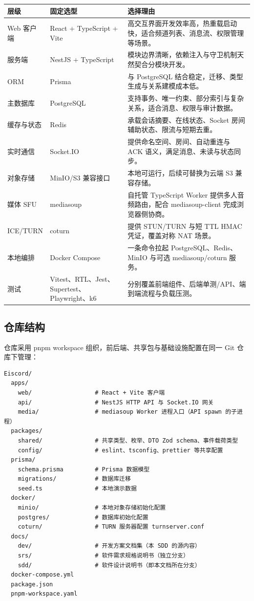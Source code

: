 \noindent\begin{tabularx}{\textwidth}{L{3.6cm}L{3.4cm}Y}
  \toprule
  层级 & 固定选型 & 选择理由 \\
  \midrule
  Web 客户端 & React + TypeScript + Vite & 高交互界面开发效率高，热重载启动快，适合频道列表、消息流、权限管理等场景。 \\
  服务端 & NestJS + TypeScript & 模块边界清晰，依赖注入与守卫机制天然契合分模块开发。 \\
  ORM & Prisma & 与 PostgreSQL 结合稳定，迁移、类型生成与关系建模成本低。 \\
  主数据库 & PostgreSQL & 支持事务、唯一约束、部分索引与复杂关系，适合消息、权限与审计数据。 \\
  缓存与状态 & Redis & 承载会话摘要、在线状态、Socket 房间辅助状态、限流与短期去重。 \\
  实时通信 & Socket.IO & 提供命名空间、房间、自动重连与 ACK 语义，满足消息、未读与状态同步。 \\
  对象存储 & MinIO/S3 兼容接口 & 本地可运行，后续可替换为云端 S3 兼容存储。 \\
  媒体 SFU & mediasoup & 自托管 TypeScript Worker 提供多人音频路由，配合 mediasoup-client 完成浏览器侧协商。 \\
  ICE/TURN & coturn & 提供 STUN/TURN 与短 TTL HMAC 凭证，覆盖对称 NAT 场景。 \\
  本地编排 & Docker Compose & 一条命令拉起 PostgreSQL、Redis、MinIO 与可选 mediasoup/coturn 服务。 \\
  测试 & Vitest、RTL、Jest、Supertest、Playwright、k6 & 分别覆盖前端组件、后端单测/API、端到端流程与负载压测。 \\
  \bottomrule
\end{tabularx}

\subsection{仓库结构}

仓库采用 pnpm workspace 组织，前后端、共享包与基础设施配置在同一 Git 仓库下管理：

\begin{verbatim}
Eiscord/
  apps/
    web/                  # React + Vite 客户端
    api/                  # NestJS HTTP API 与 Socket.IO 网关
    media/                # mediasoup Worker 进程入口（API spawn 的子进程）
  packages/
    shared/               # 共享类型、枚举、DTO Zod schema、事件载荷类型
    config/               # eslint、tsconfig、prettier 等共享配置
  prisma/
    schema.prisma         # Prisma 数据模型
    migrations/           # 数据库迁移
    seed.ts               # 本地演示数据
  docker/
    minio/                # 本地对象存储初始化配置
    postgres/             # 数据库初始化配置
    coturn/               # TURN 服务器配置 turnserver.conf
  docs/
    dev/                  # 开发方案文档集（本 SDD 的源内容）
    srs/                  # 软件需求规格说明书（独立分支）
    sdd/                  # 软件设计说明书（即本文档所在分支）
  docker-compose.yml
  package.json
  pnpm-workspace.yaml
\end{verbatim}

